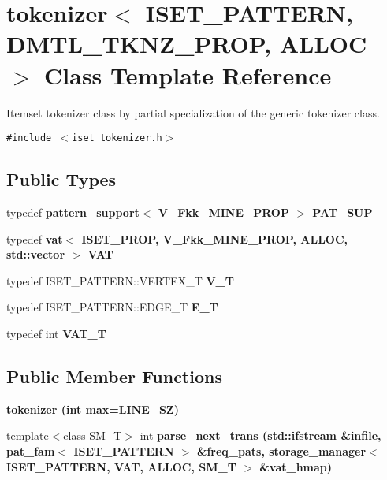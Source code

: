 \section{tokenizer$<$ ISET\_\-PATTERN, DMTL\_\-TKNZ\_\-PROP, ALLOC $>$ Class Template Reference}
\label{classtokenizer_3_01ISET__PATTERN_00_01DMTL__TKNZ__PROP_00_01ALLOC_01_4}
Itemset tokenizer class by partial specialization of the generic tokenizer class.  


{\tt \#include $<$iset\_\-tokenizer.h$>$}

\subsection*{Public Types}
\begin{CompactItemize}
\item 
typedef \bf{pattern\_\-support}$<$ V\_\-Fkk\_\-MINE\_\-PROP $>$ \textbf{PAT\_\-SUP}\label{classtokenizer_3_01ISET__PATTERN_00_01DMTL__TKNZ__PROP_00_01ALLOC_01_4_b0a850046d63135123c7b324617cabea}

\item 
typedef \bf{vat}$<$ ISET\_\-PROP, V\_\-Fkk\_\-MINE\_\-PROP, ALLOC, std::vector $>$ \textbf{VAT}\label{classtokenizer_3_01ISET__PATTERN_00_01DMTL__TKNZ__PROP_00_01ALLOC_01_4_3ba78b7dbdedd91460807d30b6a22e4e}

\item 
typedef ISET\_\-PATTERN::VERTEX\_\-T \textbf{V\_\-T}\label{classtokenizer_3_01ISET__PATTERN_00_01DMTL__TKNZ__PROP_00_01ALLOC_01_4_4b39a2e0d54ba6c93beba25c33947f27}

\item 
typedef ISET\_\-PATTERN::EDGE\_\-T \textbf{E\_\-T}\label{classtokenizer_3_01ISET__PATTERN_00_01DMTL__TKNZ__PROP_00_01ALLOC_01_4_e3b049395a49da743e67309f90c6946f}

\item 
typedef int \bf{VAT\_\-T}
\end{CompactItemize}
\subsection*{Public Member Functions}
\begin{CompactItemize}
\item 
\bf{tokenizer} (int max=LINE\_\-SZ)
\item 
template$<$class SM\_\-T$>$ int \bf{parse\_\-next\_\-trans} (std::ifstream \&infile, \bf{pat\_\-fam}$<$ ISET\_\-PATTERN $>$ \&freq\_\-pats, \bf{storage\_\-manager}$<$ ISET\_\-PATTERN, \bf{VAT}, ALLOC, SM\_\-T $>$ \&vat\_\-hmap)
\end{CompactItemize}


